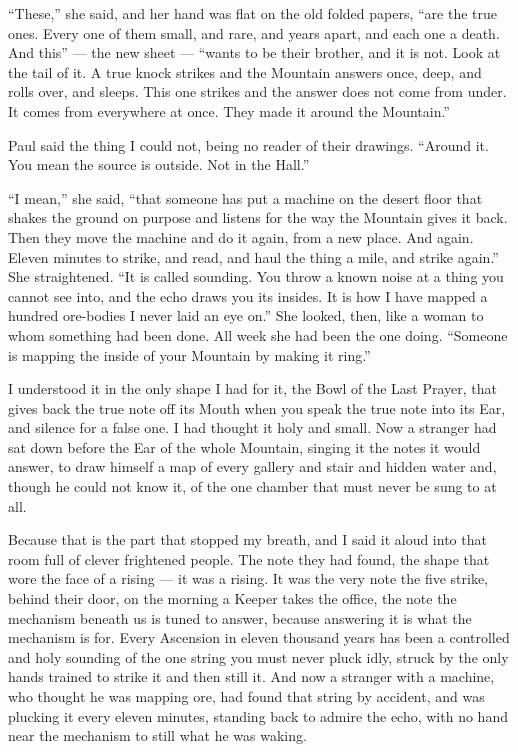 ``These,'' she said, and her hand was flat on the old folded papers, ``are the true ones. Every one of them small, and rare, and years apart, and each one a death. And this'' --- the new sheet --- ``wants to be their brother, and it is not. Look at the tail of it. A true knock strikes and the Mountain answers once, deep, and rolls over, and sleeps. This one strikes and the answer does not come from under. It comes from everywhere at once. They made it around the Mountain.''\par

Paul said the thing I could not, being no reader of their drawings. ``Around it. You mean the source is outside. Not in the Hall.''\par

``I mean,'' she said, ``that someone has put a machine on the desert floor that shakes the ground on purpose and listens for the way the Mountain gives it back. Then they move the machine and do it again, from a new place. And again. Eleven minutes to strike, and read, and haul the thing a mile, and strike again.'' She straightened. ``It is called sounding. You throw a known noise at a thing you cannot see into, and the echo draws you its insides. It is how I have mapped a hundred ore-bodies I never laid an eye on.'' She looked, then, like a woman to whom something had been done. All week she had been the one doing. ``Someone is mapping the inside of your Mountain by making it ring.''\par

I understood it in the only shape I had for it, the Bowl of the Last Prayer, that gives back the true note off its Mouth when you speak the true note into its Ear, and silence for a false one. I had thought it holy and small. Now a stranger had sat down before the Ear of the whole Mountain, singing it the notes it would answer, to draw himself a map of every gallery and stair and hidden water and, though he could not know it, of the one chamber that must never be sung to at all.\par

Because that is the part that stopped my breath, and I said it aloud into that room full of clever frightened people. The note they had found, the shape that wore the face of a rising --- it was a rising. It was the very note the five strike, behind their door, on the morning a Keeper takes the office, the note the mechanism beneath us is tuned to answer, because answering it is what the mechanism is for. Every Ascension in eleven thousand years has been a controlled and holy sounding of the one string you must never pluck idly, struck by the only hands trained to strike it and then still it. And now a stranger with a machine, who thought he was mapping ore, had found that string by accident, and was plucking it every eleven minutes, standing back to admire the echo, with no hand near the mechanism to still what he was waking.\par

